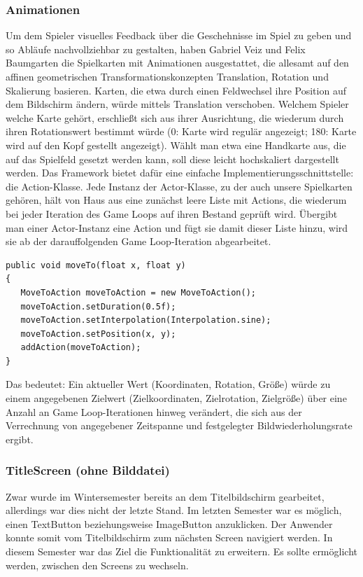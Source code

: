 \subsubsection{Animationen}
Um dem Spieler visuelles Feedback über die Geschehnisse im Spiel zu geben und so Abläufe nachvollziehbar zu gestalten, haben Gabriel Veiz und Felix Baumgarten die Spielkarten mit Animationen ausgestattet, die allesamt auf den affinen geometrischen Transformationskonzepten Translation, Rotation und Skalierung basieren.
Karten, die etwa durch einen Feldwechsel ihre Position auf dem Bildschirm ändern, würde mittels Translation verschoben. Welchem Spieler welche Karte gehört, erschließt sich aus ihrer Ausrichtung, die wiederum durch ihren Rotationswert bestimmt würde (0: Karte wird regulär angezeigt; 180: Karte wird auf den Kopf gestellt angezeigt). Wählt man etwa eine Handkarte aus, die auf das Spielfeld gesetzt werden kann, soll diese leicht hochskaliert dargestellt werden. Das Framework bietet dafür eine einfache Implementierungsschnittstelle: die Action-Klasse.
Jede Instanz der Actor-Klasse, zu der auch unsere Spielkarten gehören, hält von Haus aus eine zunächst leere Liste mit Actions, die wiederum bei jeder Iteration des Game Loops auf ihren Bestand geprüft wird. Übergibt man einer Actor-Instanz eine Action und fügt sie damit dieser Liste hinzu, wird sie ab der darauffolgenden Game Loop-Iteration abgearbeitet.
\begin{lstlisting}
public void moveTo(float x, float y)
{
   MoveToAction moveToAction = new MoveToAction();
   moveToAction.setDuration(0.5f);
   moveToAction.setInterpolation(Interpolation.sine);
   moveToAction.setPosition(x, y);
   addAction(moveToAction);
}
\end{lstlisting}
Das bedeutet: Ein aktueller Wert (Koordinaten, Rotation, Größe) würde zu einem angegebenen Zielwert (Zielkoordinaten, Zielrotation, Zielgröße) über eine Anzahl an Game Loop-Iterationen hinweg verändert, die sich aus der Verrechnung von angegebener Zeitspanne und festgelegter Bildwiederholungsrate ergibt.

\subsubsection{TitleScreen (ohne Bilddatei)}
Zwar wurde im Wintersemester bereits an dem Titelbildschirm gearbeitet, allerdings war dies nicht der letzte Stand. Im letzten Semester war es möglich, einen TextButton beziehungsweise ImageButton anzuklicken. Der Anwender konnte somit vom Titelbildschirm zum nächsten Screen navigiert werden. 
In diesem Semester war das Ziel die Funktionalität zu erweitern. 
Es sollte ermöglicht werden, zwischen den Screens zu wechseln. 

